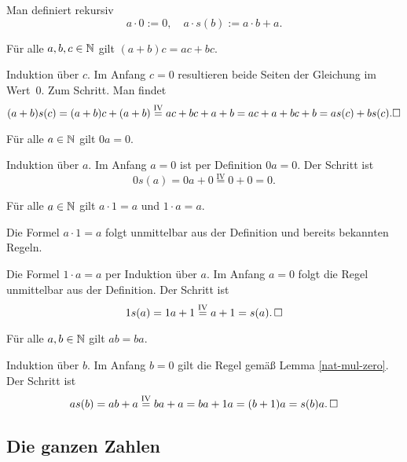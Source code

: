 \begin{Definition}\newlinefirst
Man definiert rekursiv
\[a\cdot 0 := 0,\quad a\cdot s(b) := a\cdot b+a.\]
\end{Definition}

\begin{Satz}\newlinefirst
Für alle $a,b,c\in\mathbb N$ gilt $(a+b)c = ac+bc$.
\end{Satz}
\begin{Beweis} Induktion über $c$. Im Anfang $c=0$ resultieren
beide Seiten der Gleichung im Wert~$0$. Zum Schritt. Man findet
\[(a+b)s(c) = (a+b)c+(a+b) \stackrel{\mathrm{IV}}= ac+bc+a+b = ac+a+bc+b
= as(c) + bs(c).\square\]
\end{Beweis}

\begin{Lemma}\label{nat-mul-zero}
Für alle $a\in\mathbb N$ gilt $0a=0$.
\end{Lemma}
\begin{Beweis}
Induktion über $a$. Im Anfang $a=0$ ist per Definition $0a=0$.
Der Schritt ist
\[0s(a) = 0a+0 \stackrel{\mathrm{IV}}= 0+0 = 0.\]
\end{Beweis}

\begin{Satz}\label{nat-mul-one}
Für alle $a\in\mathbb N$ gilt $a\cdot 1=a$ und $1\cdot a=a$.
\end{Satz}
\begin{Beweis}
Die Formel $a\cdot 1 = a$ folgt unmittelbar aus der Definition
und bereits bekannten Regeln.

Die Formel $1\cdot a = a$ per Induktion über $a$. Im Anfang $a=0$ folgt
die Regel unmittelbar aus der Definition. Der Schritt ist
\[1s(a) = 1a+1 \stackrel{\mathrm{IV}}= a+1 = s(a).\,\square\]
\end{Beweis}

\begin{Satz}\newlinefirst
Für alle $a,b\in\mathbb N$ gilt $ab=ba$.
\end{Satz}
\begin{Beweis}
Induktion über $b$. Im Anfang $b=0$ gilt die Regel gemäß
Lemma \ref{nat-mul-zero}. Der Schritt ist
\[as(b) = ab+a \stackrel{\mathrm{IV}}= ba+a = ba + 1a = (b+1)a = s(b)a.\,\square\]
\end{Beweis}

\subsection{Die ganzen Zahlen}

